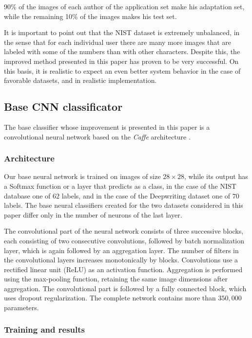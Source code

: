 \documentclass{article}
\begin{document}
90\% of the images of each author of the application set make his adaptation set, while the remaining 10\% of the images makes his test set. 

It is important to point out that the NIST dataset is extremely unbalanced, in the sense that for each individual user there are many more images that are 
labeled with some of the numbers than with other characters. 
Despite this, the improved method presented in this paper has proven to be very successful. 
On this basis, it is realistic to expect an even better system behavior in the case of favorable datasets, and in realistic implementation. 

\subsection{Base CNN classificator}

The base classifier whose improvement is presented in this paper is a convolutional neural network based on the \textit{Caffe} architecture \citet{caffe}. 

\subsubsection{Architecture}

Our base neural network is trained on images of size $28 \times 28$, while its output has a Softmax function or a layer that predicts as a class, in the case of the NIST database one of $62$ labels, 
and in the case of the Deepwriting dataset one of $70$ labels. 
The base neural classifiers created for the two datasets considered in this paper differ only in the number of neurons of the last layer. 

The convolutional part of the neural network consists of three successive blocks, each consisting of two consecutive convolutions, followed by batch normalization layer, 
which is again followed by an aggregation layer. 
The number of filters in the convolutional layers increases monotonically by blocks. 
Convolutions use a rectified linear unit (ReLU) as an activation function. 
Aggregation is performed using the max-pooling function, retaining the same image dimensions after aggregation. 
The convolutional part is followed by a fully connected block, which uses dropout regularization. 
The complete network contains more than $350,000$ parameters. 

\subsubsection{Training and results}
\end{document}
